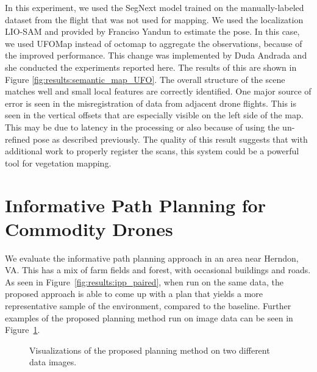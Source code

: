 In this experiment, we used the SegNext model trained on the manually-labeled dataset from the flight that was not used for mapping. We used the localization LIO-SAM \cite{Shan2020LIO-SAM:Mapping} and provided by Franciso Yandun to estimate the pose. In this case, we used UFOMap \cite{Duberg2020UFOMap:Unknown} instead of octomap to aggregate the observations, because of the improved performance. This change was implemented by Duda Andrada and she conducted the experiments reported here. The results of this are shown in Figure \ref{fig:results:semantic_map_UFO}. The overall structure of the scene matches well and small local features are correctly identified. One major source of error is seen in the misregistration of data from adjacent drone flights. This is seen in the vertical offsets that are especially visible on the left side of the map. This may be due to latency in the processing or also because of using the un-refined pose as described previously. The quality of this result suggests that with additional work to properly register the scans, this system could be a powerful tool for vegetation mapping. 



\section{Informative Path Planning for Commodity Drones}
We evaluate the informative path planning approach in an area near Herndon, VA. This has a mix of farm fields and forest, with occasional buildings and roads. As seen in Figure~\ref{fig:results:ipp_paired}, when run on the same data, the proposed approach is able to come up with a plan that yields a more representative sample of the environment, compared to the baseline. Further examples of the proposed planning method run on image data can be seen in Figure~\ref{fig:results:ipp_unpairqual}. 

\begin{figure}[h]
    \hfill
    \caption{Visualizations of the proposed planning method on two different data images.}
    \label{fig:results:ipp_unpairqual}
\end{figure}


